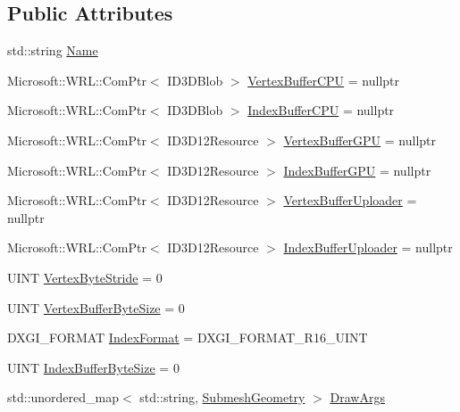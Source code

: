 \subsection*{Public Attributes}
\begin{DoxyCompactItemize}
\item 
std\+::string \hyperlink{struct_mesh_geometry_a9cfdc0d2b907a9059b32fccae59d9813_a9cfdc0d2b907a9059b32fccae59d9813}{Name}
\item 
Microsoft\+::\+W\+R\+L\+::\+Com\+Ptr$<$ I\+D3\+D\+Blob $>$ \hyperlink{struct_mesh_geometry_a79e5e540605f4205197154469bf4194e_a79e5e540605f4205197154469bf4194e}{Vertex\+Buffer\+C\+PU} = nullptr
\item 
Microsoft\+::\+W\+R\+L\+::\+Com\+Ptr$<$ I\+D3\+D\+Blob $>$ \hyperlink{struct_mesh_geometry_aa9a4e934b370f9c716217b01c15bad32_aa9a4e934b370f9c716217b01c15bad32}{Index\+Buffer\+C\+PU} = nullptr
\item 
Microsoft\+::\+W\+R\+L\+::\+Com\+Ptr$<$ I\+D3\+D12\+Resource $>$ \hyperlink{struct_mesh_geometry_afc3be274ba79e6984225407560350438_afc3be274ba79e6984225407560350438}{Vertex\+Buffer\+G\+PU} = nullptr
\item 
Microsoft\+::\+W\+R\+L\+::\+Com\+Ptr$<$ I\+D3\+D12\+Resource $>$ \hyperlink{struct_mesh_geometry_a98d981b7fd0627dbe53c31ce83d23d8f_a98d981b7fd0627dbe53c31ce83d23d8f}{Index\+Buffer\+G\+PU} = nullptr
\item 
Microsoft\+::\+W\+R\+L\+::\+Com\+Ptr$<$ I\+D3\+D12\+Resource $>$ \hyperlink{struct_mesh_geometry_a99726cbb8b6acc9599ccaae768032104_a99726cbb8b6acc9599ccaae768032104}{Vertex\+Buffer\+Uploader} = nullptr
\item 
Microsoft\+::\+W\+R\+L\+::\+Com\+Ptr$<$ I\+D3\+D12\+Resource $>$ \hyperlink{struct_mesh_geometry_a49a2735dd265091e5451c26c7e4fceb9_a49a2735dd265091e5451c26c7e4fceb9}{Index\+Buffer\+Uploader} = nullptr
\item 
U\+I\+NT \hyperlink{struct_mesh_geometry_a809bd47a42dcf1f8512c55c663354fe9_a809bd47a42dcf1f8512c55c663354fe9}{Vertex\+Byte\+Stride} = 0
\item 
U\+I\+NT \hyperlink{struct_mesh_geometry_a95d475544535050a64a841489a0e3269_a95d475544535050a64a841489a0e3269}{Vertex\+Buffer\+Byte\+Size} = 0
\item 
D\+X\+G\+I\+\_\+\+F\+O\+R\+M\+AT \hyperlink{struct_mesh_geometry_a4ab6fed21b08b6008850e43f8e912506_a4ab6fed21b08b6008850e43f8e912506}{Index\+Format} = D\+X\+G\+I\+\_\+\+F\+O\+R\+M\+A\+T\+\_\+\+R16\+\_\+\+U\+I\+NT
\item 
U\+I\+NT \hyperlink{struct_mesh_geometry_ada154aecae7686cb96099c259fa49946_ada154aecae7686cb96099c259fa49946}{Index\+Buffer\+Byte\+Size} = 0
\item 
std\+::unordered\+\_\+map$<$ std\+::string, \hyperlink{struct_submesh_geometry}{Submesh\+Geometry} $>$ \hyperlink{struct_mesh_geometry_a0b2c5e9269169fb7c5d838240957fd10_a0b2c5e9269169fb7c5d838240957fd10}{Draw\+Args}
\end{DoxyCompactItemize}


